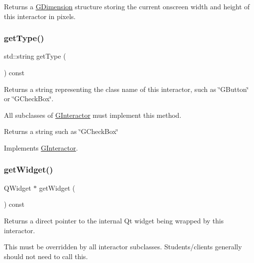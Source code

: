 Returns a \mbox{\hyperlink{classGDimension}{G\+Dimension}} structure storing the current onscreen width and height of this interactor in pixels. 

\mbox{\label{classGTable_a9896d58fcfebbf1025aeeb5b8b9ede80}} 
\subsubsection{\texorpdfstring{get\+Type()}{getType()}}
{\footnotesize\ttfamily std\+::string get\+Type (\begin{DoxyParamCaption}{ }\end{DoxyParamCaption}) const\hspace{0.3cm}{\ttfamily [virtual]}}



Returns a string representing the class name of this interactor, such as \char`\"{}\+G\+Button\char`\"{} or \char`\"{}\+G\+Check\+Box\char`\"{}. 

All subclasses of \mbox{\hyperlink{classGInteractor}{G\+Interactor}} must implement this method. \begin{DoxyReturn}{Returns}
a string such as \char`\"{}\+G\+Check\+Box\char`\"{} 
\end{DoxyReturn}


Implements \mbox{\hyperlink{classGInteractor_a799e073a127b428cc841086d42ea4fed}{G\+Interactor}}.

\mbox{\label{classGTable_a326ee51b5561f807df7b29a1c101f7fd}} 
\subsubsection{\texorpdfstring{get\+Widget()}{getWidget()}}
{\footnotesize\ttfamily Q\+Widget $\ast$ get\+Widget (\begin{DoxyParamCaption}{ }\end{DoxyParamCaption}) const\hspace{0.3cm}{\ttfamily [virtual]}}



Returns a direct pointer to the internal Qt widget being wrapped by this interactor. 

This must be overridden by all interactor subclasses. Students/clients generally should not need to call this. 


